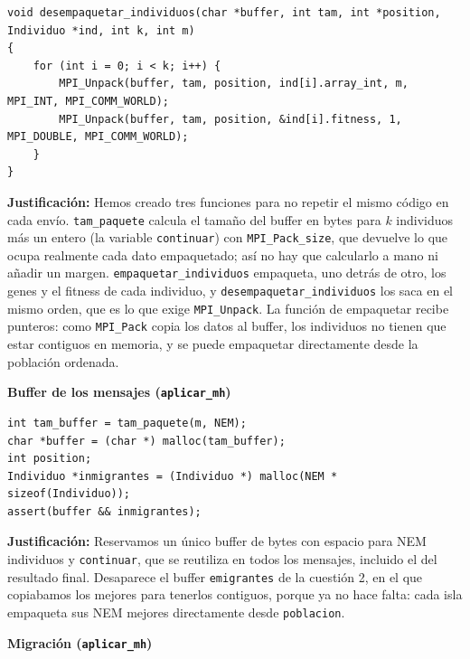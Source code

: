 \documentclass[12pt]{article}
\begin{document}
\begin{enumerate}
\begin{lstlisting}[style=EstiloC]
void desempaquetar_individuos(char *buffer, int tam, int *position, Individuo *ind, int k, int m)
{
	for (int i = 0; i < k; i++) {
		MPI_Unpack(buffer, tam, position, ind[i].array_int, m, MPI_INT, MPI_COMM_WORLD);
		MPI_Unpack(buffer, tam, position, &ind[i].fitness, 1, MPI_DOUBLE, MPI_COMM_WORLD);
	}
}
\end{lstlisting}

\textbf{Justificación:} Hemos creado tres funciones para no repetir el mismo código en cada envío. \texttt{tam\_paquete} calcula el tamaño del buffer en bytes para $k$ individuos más un entero (la variable \texttt{continuar}) con \texttt{MPI\_Pack\_size}, que devuelve lo que ocupa realmente cada dato empaquetado; así no hay que calcularlo a mano ni añadir un margen. \texttt{empaquetar\_individuos} empaqueta, uno detrás de otro, los genes y el fitness de cada individuo, y \texttt{desempaquetar\_individuos} los saca en el mismo orden, que es lo que exige \texttt{MPI\_Unpack}. La función de empaquetar recibe punteros: como \texttt{MPI\_Pack} copia los datos al buffer, los individuos no tienen que estar contiguos en memoria, y se puede empaquetar directamente desde la población ordenada.

\vspace{0.5cm}


\medskip
\noindent\textbf{Buffer de los mensajes (\texttt{aplicar\_mh})}\par
\smallskip

\begin{lstlisting}[style=EstiloC]
int tam_buffer = tam_paquete(m, NEM);
char *buffer = (char *) malloc(tam_buffer);
int position;
Individuo *inmigrantes = (Individuo *) malloc(NEM * sizeof(Individuo));
assert(buffer && inmigrantes);
\end{lstlisting}

\textbf{Justificación:} Reservamos un único buffer de bytes con espacio para NEM individuos y \texttt{continuar}, que se reutiliza en todos los mensajes, incluido el del resultado final. Desaparece el buffer \texttt{emigrantes} de la cuestión 2, en el que copiabamos los mejores para tenerlos contiguos, porque ya no hace falta: cada isla empaqueta sus NEM mejores directamente desde \texttt{poblacion}.

\vspace{0.5cm}


\medskip
\noindent\textbf{Migración (\texttt{aplicar\_mh})}\par
\smallskip


\end{enumerate}
\end{document}
